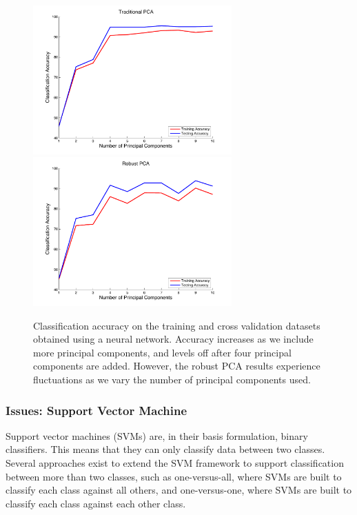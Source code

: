 \documentclass[12pt]{article}
\begin{document}
\begin{figure}[H]
\centering
\includegraphics[width=3in]{figures/nn_trad} \quad
\includegraphics[width=3in]{figures/nn_robust}
\caption{Classification accuracy on the training and cross validation datasets obtained using a neural network. Accuracy increases as we include more principal components, and levels off after four principal components are added. However, the robust PCA results experience fluctuations as we vary the number of principal components used.}
\end{figure}


\subsubsection{Issues: Support Vector Machine}

Support vector machines (SVMs) are, in their basis formulation, binary classifiers. This means that they can only classify data between two classes. Several approaches exist to extend the SVM framework to support classification between more than two classes, such as one-versus-all, where SVMs are built to classify each class against all others, and one-versus-one, where SVMs are built to classify each class against each other class.
\end{document}
